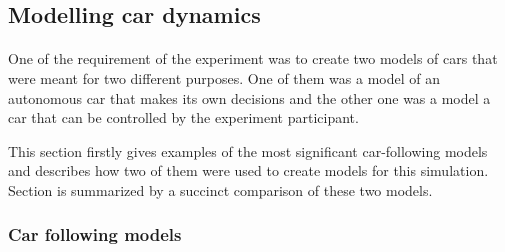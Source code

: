 \documentclass[11pt,english]{article}
\begin{document}















\subsection{Modelling car dynamics}
\paragraph{}
One of the requirement of the experiment was to create two models of cars that were meant for two different purposes. One of them was a model of an autonomous car that makes its own decisions and the other one was a model a car that can be controlled by the experiment participant. 

\par
This section firstly gives examples of the most significant car-following models and describes how two of them were used to create models for this simulation. Section is summarized by a succinct comparison of these two models.



\subsubsection{Car following models}
\end{document}

